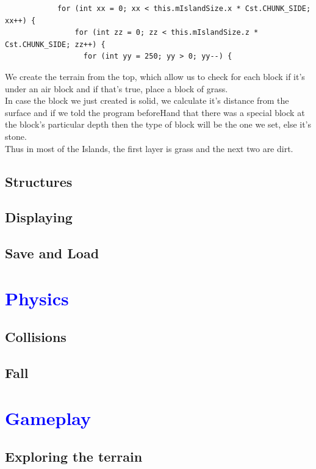 \documentclass[article]{report}         %
\begin{document}
          \begin{lstlisting}  
            for (int xx = 0; xx < this.mIslandSize.x * Cst.CHUNK_SIDE; xx++) {
                for (int zz = 0; zz < this.mIslandSize.z * Cst.CHUNK_SIDE; zz++) {
                  for (int yy = 250; yy > 0; yy--) {
          \end{lstlisting}

            We create the terrain from the top, which allow us to check for each block if it's under an air block and if that's true, place a block of grass.\\
            In case the block we just created is solid, we calculate it's distance from the surface and if we told the program beforeHand that there was a special block at the block's particular depth then the type of block will be the one we set, else it's stone.\\

            Thus in most of the Islands, the first layer is grass and the next two are dirt.
      \section{Structures}

      \section{Displaying}
      \section{Save and Load}
		\chapter{\textcolor{blue}{Physics}}
      \section{Collisions} %
      \section{Fall}
		\chapter{\textcolor{blue}{Gameplay}}
      \section{Exploring the terrain}
\end{document}
